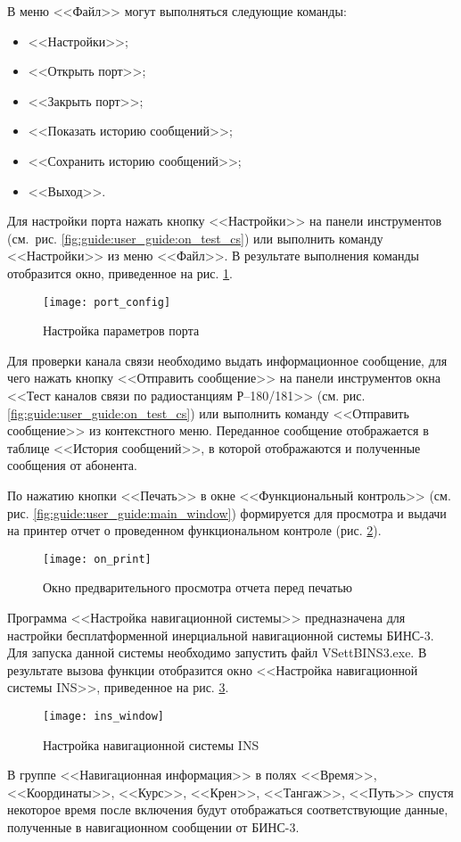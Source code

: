 В меню <<Файл>> могут выполняться следующие команды:
\begin{itemize}
	\item <<Настройки>>;
	\item <<Открыть порт>>;
	\item <<Закрыть порт>>;
	\item <<Показать историю сообщений>>;
	\item <<Сохранить историю сообщений>>;
	\item <<Выход>>.
\end{itemize}

Для настройки порта нажать кнопку <<Настройки>> на панели инструментов (см. рис. \ref{fig:guide:user_guide:on_test_cs}) или выполнить команду
<<Настройки>> из меню <<Файл>>.
В результате выполнения команды отобразится окно, приведенное на рис. \ref{fig:guide:user_guide:port_config}.
\begin{figure}[htb]
	\centering
	\texttt{[image: port\_config]}
	\caption{Настройка параметров порта}
	\label{fig:guide:user_guide:port_config}
\end{figure}
Для проверки канала связи необходимо выдать информационное сообщение, для чего нажать кнопку <<Отправить сообщение>> на
панели инструментов окна <<Тест каналов связи по радиостанциям Р–180/181>> (см. рис.
\ref{fig:guide:user_guide:on_test_cs}) или выполнить команду <<Отправить сообщение>> из контекстного меню.
Переданное сообщение отображается в таблице <<История сообщений>>, в которой отображаются и полученные сообщения от абонента.

По нажатию кнопки <<Печать>> в окне <<Функциональный контроль>>
(см. рис. \ref{fig:guide:user_guide:main_window}) формируется для просмотра и выдачи на принтер отчет
о проведенном функциональном контроле (рис. \ref{fig:guide:user_guide:on_print}).
\begin{figure}[htb]
	\centering
	\texttt{[image: on\_print]}
	\caption{Окно предварительного просмотра отчета перед печатью}
	\label{fig:guide:user_guide:on_print}
\end{figure}

Программа <<Настройка навигационной системы>> предназначена для настройки бесплатформенной инерциальной навигационной системы БИНС-3.
Для запуска данной системы необходимо запустить файл VSettBINS3.exe.
В результате вызова функции отобразится окно <<Настройка навигационной системы INS>>, приведенное на рис.
\ref{fig:guide:user_guide:ins_window}.
\begin{figure}[!htb]
	\centering
	\texttt{[image: ins\_window]}
	\caption{Настройка навигационной системы INS}
	\label{fig:guide:user_guide:ins_window}
\end{figure}
В группе <<Навигационная информация>> в полях <<Время>>, <<Координаты>>, <<Курс>>, <<Крен>>, <<Тангаж>>, <<Путь>> спустя некоторое
время после включения будут
отображаться соответствующие данные, полученные в навигационном сообщении от БИНС-3.

